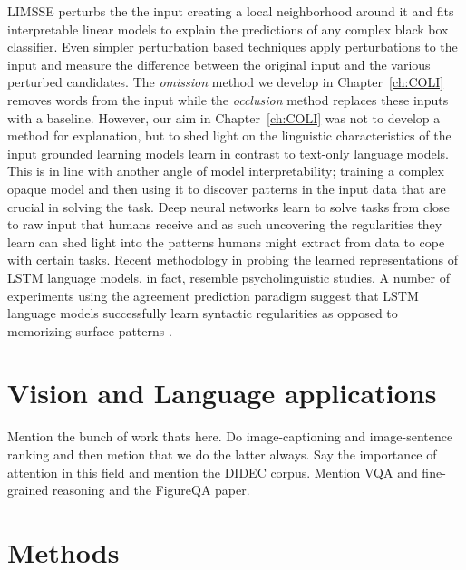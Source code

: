 LIMSSE \cite{poerner2018evaluating} perturbs the
the input creating a local neighborhood around it and fits interpretable linear models to explain the predictions of any complex black box classifier.
Even simpler perturbation based techniques apply perturbations to the input and measure the difference between the original input and the various
perturbed candidates. The \emph{omission} method we develop in Chapter~\ref{ch:COLI} removes words from the input while the \emph{occlusion} \cite{li2016understanding}
method replaces these inputs with a baseline.  However, our aim in Chapter~\ref{ch:COLI} was not to develop a method for explanation, but to
shed light on the linguistic characteristics of the input grounded learning models learn in contrast to text-only language models.
This is in line with another angle of model interpretability; training a complex opaque model and then using it to discover patterns in the
input data that are crucial in solving the task. Deep neural networks learn to solve tasks from close to raw input that humans receive and as such
uncovering the regularities they learn can shed light into the patterns humans might extract from data to cope with certain tasks.
Recent methodology in probing the learned representations of LSTM language models, in fact, resemble psycholinguistic studies.
A number of experiments using the agreement prediction paradigm \cite{bock1991broken} suggest that
LSTM language models successfully learn syntactic regularities as opposed to memorizing surface patterns
\cite{linzen2016assessing,enguehard2017exploring,bernardy2017using,gulordava2018colorless}.

\section{Vision and Language applications}
Mention the bunch of work thats here. Do image-captioning and image-sentence ranking and then metion that we do the latter always. Say the importance of attention in this field and mention the DIDEC corpus. Mention VQA and fine-grained reasoning and the FigureQA paper.



\section{Methods}

